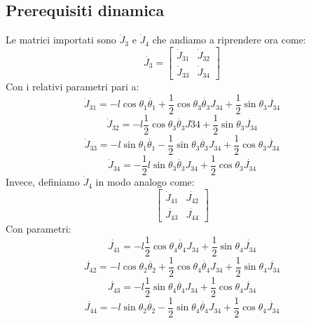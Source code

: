 \subsection{Prerequisiti dinamica}\label{appendice:t34punto}
Le matrici importati sono $\dot{J}_3$ e $\dot{J}_4$ che andiamo a riprendere ora come:
\begin{equation}
\dot{J_3} =
\begin{bmatrix}
 	\dot{J}_{31} & \dot{J}_{32} \\ 
 	\dot{J}_{33} & \dot{J}_{34}
 \end{bmatrix}
\end{equation}
Con i relativi parametri pari a:
\begin{equation*}
\dot{J}_{31} = -l\cos\theta_1\dot{\theta_1}+\frac{1}{2}\cos\theta_3\dot{\theta_3}J_{34}+\frac{1}{2}\sin\theta_3\dot{J_{34}}
\end{equation*}
\begin{equation*}
\dot{J}_{32} =   -l\frac{1}{2}\cos\theta_3\dot{\theta_3}J34+\frac{1}{2}\sin\theta_3\dot{J_{34}} 
\end{equation*}
\begin{equation*}
\dot{J}_{33} =  -l\sin\theta_1\dot{\theta_1}-\frac{1}{2}\sin\theta_3\dot{\theta_3}J_{34}+\frac{1}{2}\cos\theta_3\dot{J_{34}}
\end{equation*}
\begin{equation*}
\dot{J}_{34} = -\frac{1}{2}l\sin\theta_3\dot{\theta_3}J_{34}+\frac{1}{2}\cos\theta_3\dot{J_{34}}
\end{equation*}
Invece, definiamo $\dot{J}_4$ in modo analogo come:
\begin{equation}
\begin{bmatrix}
\dot{J}_{41}  & \dot{J_{42}} \\ \dot{J_{43}} & \dot{J_{44}}
\end{bmatrix}
\end{equation}
Con parametri:
\begin{equation*}
\dot{J_{41}}= -l﻿\frac{1}{2}\cos\theta_4\dot{\theta_4}J_{34}+﻿\frac{1}{2}\sin\theta_4\dot{J_{34}}
\end{equation*}
\begin{equation*}
\dot{J_{42}}= -l\cos\theta_2\dot{\theta_2}+﻿\frac{1}{2}\cos\theta_4\dot{\theta_4}J_{34}+﻿\frac{1}{2}\sin\theta_4\dot{J_{34}}
\end{equation*}
\begin{equation*}
\dot{J_{43}}=  -l\frac{1}{2}\sin\theta_4\dot{\theta_4}J_{34}+﻿\frac{1}{2}\cos\theta_4\dot{J_{34}}          
\end{equation*}
\begin{equation*}
\dot{J_{44}}= -l\sin\theta_2\dot{\theta_2}-﻿\frac{1}{2}\sin\theta_4\dot{\theta_4}J_{34}+﻿\frac{1}{2}\cos\theta_4\dot{J_{34}}
\end{equation*}